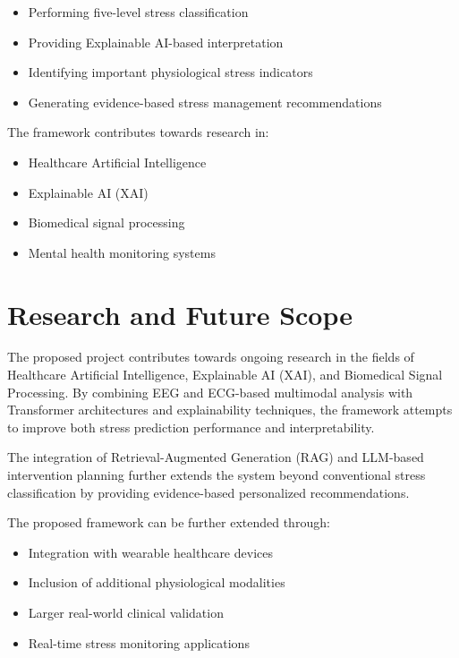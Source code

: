 \documentclass[12pt,a4paper]{report}
\begin{document}
\begin{itemize}
    \item Performing five-level stress classification
    \item Providing Explainable AI-based interpretation
    \item Identifying important physiological stress indicators
    \item Generating evidence-based stress management recommendations
\end{itemize}

The framework contributes towards research in:

\begin{itemize}
    \item Healthcare Artificial Intelligence
    \item Explainable AI (XAI)
    \item Biomedical signal processing
    \item Mental health monitoring systems
\end{itemize}

\section{Research and Future Scope}

The proposed project contributes towards ongoing research in the fields of Healthcare Artificial Intelligence, Explainable AI (XAI), and Biomedical Signal Processing. By combining EEG and ECG-based multimodal analysis with Transformer architectures and explainability techniques, the framework attempts to improve both stress prediction performance and interpretability.

The integration of Retrieval-Augmented Generation (RAG) and LLM-based intervention planning further extends the system beyond conventional stress classification by providing evidence-based personalized recommendations.

The proposed framework can be further extended through:

\begin{itemize}
    \item Integration with wearable healthcare devices
    \item Inclusion of additional physiological modalities
    \item Larger real-world clinical validation
    \item Real-time stress monitoring applications
\end{itemize}
\end{document}
